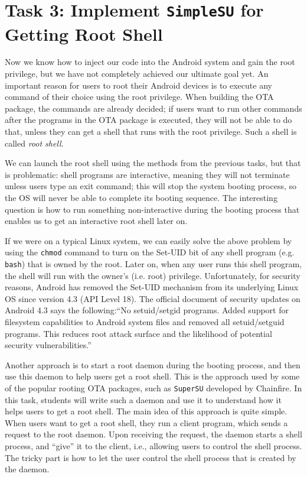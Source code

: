 \section{Task 3: Implement \texttt{SimpleSU} for Getting Root Shell}

Now we know how to inject our code into the Android system and gain the root privilege, but we
have not completely achieved our ultimate goal yet. An important
reason for users to root their Android devices is to execute any command of their choice 
using the root privilege. When building the OTA package, the commands are already decided; if
users want to run other commands after the programs in the OTA package is executed, they will
not be able to do that, unless they can get a shell that runs with the root privilege. Such a
shell is called \textit{root shell}.  


We can launch the root shell using the methods from the previous tasks, but that is
problematic: shell programs are interactive, meaning they will not terminate unless users type
an exit command; this will stop the system booting process, so the OS will never  be able to
complete its booting sequence. The interesting question is how to run something 
non-interactive during the booting process that enables us to get an interactive root shell later on.


If we were on a typical Linux system, we can easily solve the above problem by using the 
\texttt{chmod} command to  turn on the Set-UID bit of any shell program (e.g. \texttt{bash})
that is owned by the root. Later on, when any user runs this shell program,  the shell will run
with the owner's (i.e. root) privilege. 
Unfortunately, for security reasons, Android has removed the Set-UID mechanism from its
underlying Linux OS since version 4.3 (API Level 18).
The official document of security updates on Android 4.3 says the following:``No setuid/setgid programs. 
Added support for filesystem capabilities to Android system
files and removed all setuid/setguid programs.  This reduces root attack surface and the
likelihood of potential security vulnerabilities.''


Another approach is to start a root daemon during the booting process, and then use this daemon to
help users get a root shell. This is the approach used by some of the popular rooting OTA packages, such as 
\texttt{SuperSU} developed by Chainfire. 
In this task, students will write such a daemon and use it to understand how it helps users to get a root shell. 
The main idea of this approach is quite simple. When users want to get a root shell, they run a
client program, which sends a request to the root daemon. Upon receiving the request, the
daemon starts a shell process, and ``give'' it to the client, i.e., allowing users to control
the shell process. The tricky part is how to let the user  control the shell process that is
created by the daemon.   


